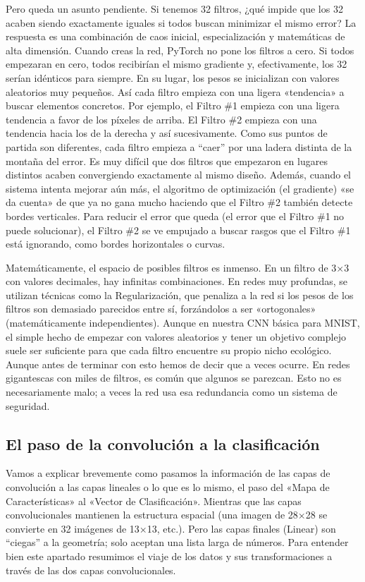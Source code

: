\documentclass[a4paper,11pt]{article}
\begin{document}
Pero queda un asunto pendiente. Si tenemos 32 filtros, ¿qué impide que
los 32 acaben siendo exactamente iguales si todos buscan minimizar el
mismo error? La respuesta es una combinación de caos inicial,
especialización y matemáticas de alta dimensión. Cuando creas la red,
PyTorch no pone los filtros a cero. Si todos empezaran en cero, todos
recibirían el mismo gradiente y, efectivamente, los 32 serían idénticos
para siempre. En su lugar, los pesos se inicializan con valores
aleatorios muy pequeños. Así cada filtro empieza con una ligera
«tendencia» a buscar elementos concretos. Por ejemplo, el Filtro \#1
empieza con una ligera tendencia a favor de los píxeles de arriba. El
Filtro \#2 empieza con una tendencia hacia los de la derecha y así
sucesivamente. Como sus puntos de partida son diferentes, cada filtro
empieza a ``caer'' por una ladera distinta de la montaña del error. Es
muy difícil que dos filtros que empezaron en lugares distintos acaben
convergiendo exactamente al mismo diseño. Además, cuando el sistema
intenta mejorar aún más, el algoritmo de optimización (el gradiente) «se
da cuenta» de que ya no gana mucho haciendo que el Filtro \#2 también
detecte bordes verticales. Para reducir el error que queda (el error que
el Filtro \#1 no puede solucionar), el Filtro \#2 se ve empujado a
buscar rasgos que el Filtro \#1 está ignorando, como bordes horizontales
o curvas.

Matemáticamente, el espacio de posibles filtros es inmenso. En un filtro
de 3×3 con valores decimales, hay infinitas combinaciones. En redes muy
profundas, se utilizan técnicas como la Regularización, que penaliza a
la red si los pesos de los filtros son demasiado parecidos entre sí,
forzándolos a ser «ortogonales» (matemáticamente independientes). Aunque
en nuestra CNN básica para MNIST, el simple hecho de empezar con valores
aleatorios y tener un objetivo complejo suele ser suficiente para que
cada filtro encuentre su propio nicho ecológico. Aunque antes de
terminar con esto hemos de decir que a veces ocurre. En redes
gigantescas con miles de filtros, es común que algunos se parezcan. Esto
no es necesariamente malo; a veces la red usa esa redundancia como un
sistema de seguridad.


\subsection{El paso de la convolución a la clasificación}

Vamos a explicar brevemente como pasamos la información de las capas de
convolución a las capas lineales o lo que es lo mismo, el paso del «Mapa
de Características» al «Vector de Clasificación». Mientras que las capas
convolucionales mantienen la estructura espacial (una imagen de 28×28 se
convierte en 32 imágenes de 13×13, etc.). Pero las capas finales
(Linear) son ``ciegas'' a la geometría; solo aceptan una lista larga de
números. Para entender bien este apartado resumimos el viaje de los
datos y sus transformaciones a través de las dos capas convolucionales.
\end{document}
